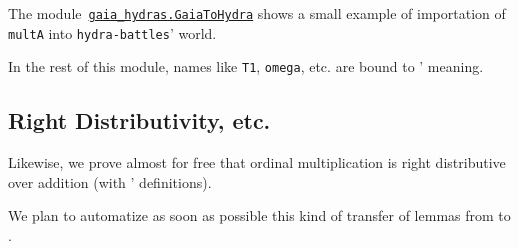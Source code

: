 
The module~\href{../theories/html/gaia_hydras.GaiaToHydra.html}%
{\texttt{gaia\_hydras.GaiaToHydra}} shows a small
example of importation of \texttt{multA} into \texttt{hydra-battles}' world.


In the rest of this module, names like  \texttt{T1}, \texttt{omega}, etc. are  bound to \HydrasLib' meaning.


 \subsection{Right Distributivity, etc.}
 Likewise, we prove almost for free that ordinal multiplication is right distributive over addition (with \HydrasLib' definitions).


We plan to automatize as soon as possible this kind of transfer of lemmas from \gaia to \HydrasLib.











